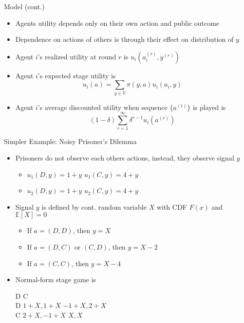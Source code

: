\documentclass[11pt,aspectratio=169,handout]{beamer}
\begin{document}
  \begin{frame}{Model (cont.)}
   \begin{itemize}[<+->]
    \item Agents utility depends \alert{only} on their own action and public outcome
    \item Dependence on actions of others is through their effect on distribution of $y$
    \item Agent $i$'s \alert{realized} utility at round $r$ is $u_i(a_i^{(r)}, y^{(r)})$
    \item Agent $i$'s expected stage utility is
    $$
    u_i(a) =\sum_{y\in Y}\pi(y,a)u_i(a_i,y) 
    $$
    \item Agent $i$'s average discounted utility when sequence $\{ a^{(t)}\}$ is played is
    $$
     (1 - \delta)\sum_{r=1}^{\infty}\delta^{r-1} u_i(a^{(r)}) 
    $$
   \end{itemize}
  \end{frame}
  
  
  \begin{frame}{Simpler Example: Noisy Prisoner's Dilemma}
   \begin{itemize}[<+->]
   \setlength{\itemsep}{0.5em}
    \item Prisoners do not observe each others actions, instead, they observe signal $y$
    \begin{itemize}
     \item $u_{1}(D, y) = 1 + y $   \hspace{1cm} $u_{1}(C, y) = 4 + y $ 
     \item $u_{2}(D, y) = 1 + y $   \hspace{1cm} $u_{2}(C, y) = 4 + y $ 
    \end{itemize}
    \item Signal $y$ is defined by cont. random variable $X$ with CDF $F(x)$ and $\mathbb{E}[X] = 0$
    \begin{itemize}
     \item If $a = (D, D)$, then $y = X$
     \item If $a = (D, C)$ or $(C, D)$, then $y = X - 2$
     \item If $a = (C, C)$, then $y = X - 4$ 
    \end{itemize}
    \item Normal-form stage game is
    \begin{center}\footnotesize
     \hspace{-6em}
     \begin{game}{2}{2}
      	\> D					\> C						\\
      D	\> $1 + X, 1 + X$	\> $ -1 + X, 2 + X$	\\
      C	\> $2 + X, -1 + X$	\> $ X, X$
     \end{game}
    \end{center}
   \end{itemize}
  \end{frame}
\end{document}
